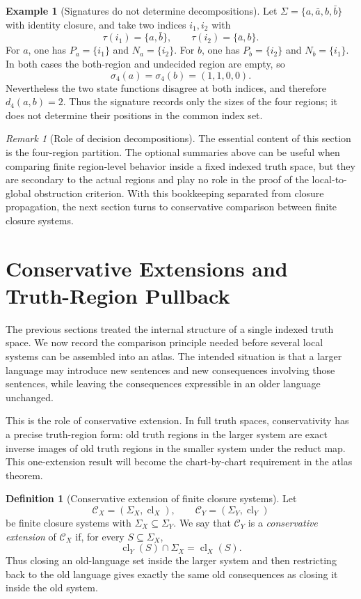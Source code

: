 \documentclass[11pt]{amsart}
\numberwithin{equation}{section}
\theoremstyle{plain}
\theoremstyle{definition}
\newtheorem{definition}[theorem]{Definition}
\newtheorem{example}[theorem]{Example}
\theoremstyle{remark}
\newtheorem{remark}[theorem]{Remark}
\newcommand{\Cl}{\operatorname{cl}}
\newcommand{\C}{\mathcal C}
\newcommand{\Sig}{\Sigma}
\begin{document}
\begin{example}[Signatures do not determine decompositions]
\label{ex:signature-not-complete}
Let \(\Sig=\{a,\bar a,b,\bar b\}\) with identity closure, and take two indices \(i_1,i_2\) with
\[
  \tau(i_1)=\{a,\bar b\},
  \qquad
  \tau(i_2)=\{\bar a,b\}.
\]
For \(a\), one has \(P_a=\{i_1\}\) and \(N_a=\{i_2\}\).  For \(b\), one has \(P_b=\{i_2\}\) and \(N_b=\{i_1\}\).  In both cases the both-region and undecided region are empty, so
\[
  \sigma_4(a)=\sigma_4(b)=(1,1,0,0).
\]
Nevertheless the two state functions disagree at both indices, and therefore \(d_4(a,b)=2\).  Thus the signature records only the sizes of the four regions; it does not determine their positions in the common index set.
\end{example}

\begin{remark}[Role of decision decompositions]
The essential content of this section is the four-region partition.  The optional summaries above can be useful when comparing finite region-level behavior inside a fixed indexed truth space, but they are secondary to the actual regions and play no role in the proof of the local-to-global obstruction criterion.  With this bookkeeping separated from closure propagation, the next section turns to conservative comparison between finite closure systems.
\end{remark}

\section{Conservative Extensions and Truth-Region Pullback}
\label{sec:conservative-closure-extensions}

The previous sections treated the internal structure of a single indexed truth space.  We now record the comparison principle needed before several local systems can be assembled into an atlas.  The intended situation is that a larger language may introduce new sentences and new consequences involving those sentences, while leaving the consequences expressible in an older language unchanged.

This is the role of conservative extension.  In full truth spaces, conservativity has a precise truth-region form: old truth regions in the larger system are exact inverse images of old truth regions in the smaller system under the reduct map.  This one-extension result will become the chart-by-chart requirement in the atlas theorem.

\begin{definition}[Conservative extension of finite closure systems]
\label{def:conservative-closure-extension}
Let
\[
  \C_X=(\Sig_X,\Cl_X),
  \qquad
  \C_Y=(\Sig_Y,\Cl_Y)
\]
be finite closure systems with \(\Sig_X\subseteq\Sig_Y\). We say that \(\C_Y\) is a \emph{conservative extension} of \(\C_X\) if, for every \(S\subseteq\Sig_X\),
\[
  \Cl_Y(S)\cap\Sig_X=\Cl_X(S).
\]
Thus closing an old-language set inside the larger system and then restricting back to the old language gives exactly the same old consequences as closing it inside the old system.
\end{definition}
\end{document}
